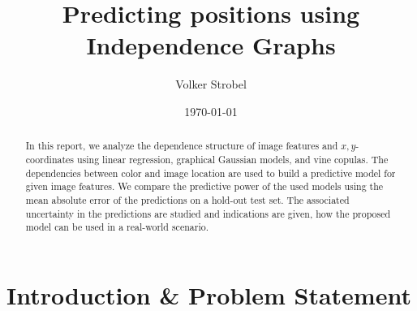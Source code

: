 \documentclass{article}
\title{Predicting positions using Independence Graphs}
\author{Volker Strobel}
\date{\today}
\begin{document}
\maketitle









\begin{abstract}
  In this report, we analyze the dependence structure of image
  features and $x,y$-coordinates using linear regression, graphical
  Gaussian models, and vine copulas. The dependencies between color
  and image location are used to build a predictive model for given
  image features. We compare the predictive power of the used models
  using the mean absolute error of the predictions on a hold-out test
  set. The associated uncertainty in the predictions are studied and
  indications are given, how the proposed model can be used in a
  real-world scenario.
\end{abstract}


\section{Introduction \& Problem Statement}




\end{document}
